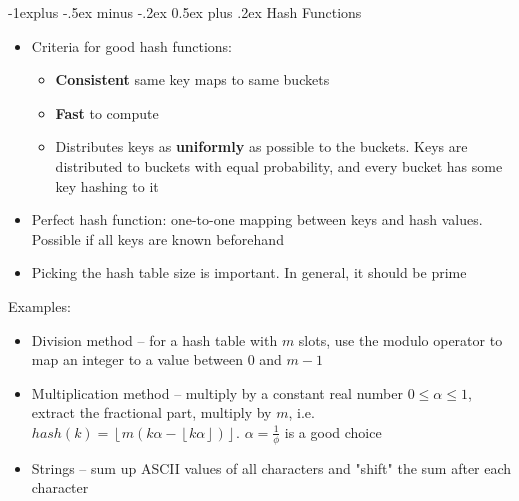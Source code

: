 \documentclass[10pt,landscape,a4paper]{article}
\makeatletter
\renewcommand{\subsection}{\@startsection{subsection}{2}{0mm}%
                                {-1explus -.5ex minus -.2ex}%
                                {0.5ex plus .2ex}%
                                {\normalfont\normalsize\bfseries}}
\newcommand{\floor}[1]{\left\lfloor #1 \right\rfloor}
\makeatother
\begin{document}
\begin{multicols}{4}
\subsection{Hash Functions}
\begin{itemize}
	\item Criteria for good hash functions:
		\begin{itemize}
			\item \textbf{Consistent} same key maps to same buckets
			\item \textbf{Fast} to compute
			\item Distributes keys as \textbf{uniformly} as possible to the buckets. Keys are distributed to buckets with equal probability, and every bucket has some key hashing to it
		\end{itemize}
	\item Perfect hash function: one-to-one mapping between keys and hash values. Possible if all keys are known beforehand	
	\item Picking the hash table size is important. In general, it should be prime
\end{itemize}
Examples:
\begin{itemize}
	\item Division method -- for a hash table with $m$ slots, use the modulo operator to map an integer to a value between  $0$ and  $m-1$
	\item Multiplication method -- multiply by a constant real number $0\leq\alpha\leq 1$, extract the fractional part, multiply by $m$, i.e.  $hash(k)=\floor{m(k\alpha-\floor{k\alpha})}$. $\alpha=\frac{1}{\phi}$ is a good choice
	\item Strings -- sum up ASCII values of all characters and "shift" the sum after each character
\end{itemize}

\end{multicols}
\end{document}
